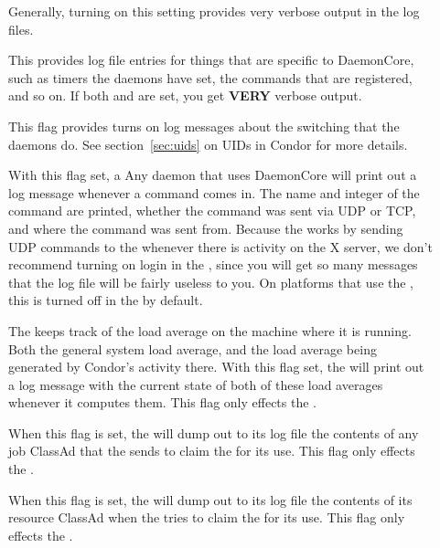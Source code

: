 \begin{description}
\begin{description}
\item[] \label{dflag:fulldebug} Generally, turning on
  this setting provides very verbose output in the log files.

\item[] \label{dflag:daemoncore} This provides log
  file entries for things that are specific to DaemonCore, such as
  timers the daemons have set, the commands that are registered, and
  so on.  If both  and  are set,
  you get \textbf{VERY} verbose output.

\item[] \label{dflag:priv} This flag provides turns on log
  messages about the  switching that the daemons
  do.  See section~\ref{sec:uids} on UIDs in Condor for more details.

\item[] \label{dflag:command} With this flag set, a
  Any daemon that uses DaemonCore will print out a log message
  whenever a command comes in.  The name and integer of the command
  are printed, whether the command was sent via UDP or TCP, and where
  the command was sent from.  Because the  works by
  sending UDP commands to the  whenever there is
  activity on the X server, we don't recommend turning on
   login in the , since you will get so
  many messages that the log file will be fairly useless to you.  On
  platforms that use the , this is turned off in the
   by default.

\item[] \label{dflag:load} The  keeps track
  of the load average on the machine where it is running.  Both the
  general system load average, and the load average being generated by
  Condor's activity there.  With this flag set, the 
  will print out a log message with the current state of both of these
  load averages whenever it computes them.  This flag only effects the
  .
  
\item[] \label{dflag:job} When this flag is set, the
   will dump out to its log file the contents of any
  job ClassAd that the  sends to claim the
   for its use.  This flag only effects the
  .
  
\item[] \label{dflag:machine} When this flag is set,
  the  will dump out to its log file the contents of
  its resource ClassAd when the  tries to claim the
   for its use.  This flag only effects the
  .


\end{description}
\end{description}
